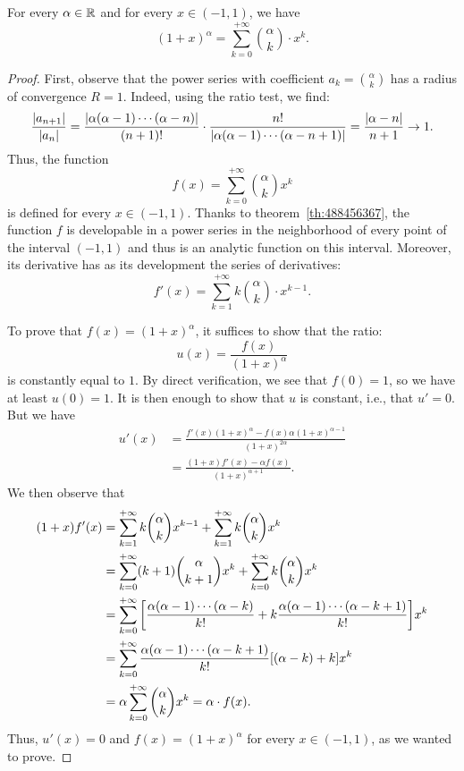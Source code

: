 \begin{theorem}
\label{th:serie_binomiale}%
%
For every $\alpha\in {\mathbb R}$ and for every $x\in (-1,1)$, we have
\[
  (1+x)^{\alpha}  = \sum_{k=0}^{+\infty} {\alpha \choose k} \cdot x^k.
\]
\end{theorem}
%
\begin{proof}
First, observe that the power series with coefficient $a_k = {\alpha \choose k}$
has a radius of convergence $R=1$. Indeed, using the ratio test, we find:
\[
  \frac{{\left|a_{n+1}\right|}}{{\left|a_n\right|}}
  = \frac{{\left|\alpha (\alpha-1) \cdots (\alpha-n)\right|}}{(n+1)!}
  \cdot \frac{n!}{{\left|\alpha(\alpha-1) \cdots (\alpha-n+1)\right|}}
  = \frac{{\left|\alpha-n\right|}}{n+1} \to 1.
\]
Thus, the function
\[
 f(x) = \sum_{k=0}^{+\infty} {\alpha \choose k} x^k
\]
is defined for every $x\in(-1,1)$. Thanks to theorem~\ref{th:488456367}, the
function $f$ is developable in a power series in the neighborhood of every point
of the interval $(-1,1)$ and thus is an analytic function on this interval.
Moreover, its derivative has as its development the series of derivatives:
\[
  f'(x) = \sum_{k=1}^{+\infty} k {\alpha \choose k} \cdot x^{k-1}.
\]

To prove that $f(x) = (1+x)^\alpha$, it suffices to show that the ratio:
\[
  u(x) = \frac{f(x)}{(1+x)^\alpha}
\]
is constantly equal to $1$. By direct verification, we see that $f(0)=1$, so we
have at least $u(0) = 1$. It is then enough to show that $u$ is constant, i.e.,
that $u'=0$. But we have
\begin{align*}
  u'(x)
    &= \frac{f'(x) (1+x)^\alpha - f(x) \alpha (1+x)^{\alpha-1}}{(1+x)^{2\alpha}}
  \\
  &= \frac{(1+x) f'(x) - \alpha f(x)}{(1+x)^{\alpha+1}}.
\end{align*}
We then observe that
\begin{align*}
(1+x)f'(x)
&= \sum_{k=1}^{+\infty} k{\alpha \choose k} x^{k-1}
+ \sum_{k=1}^{+\infty} k{\alpha \choose k} x^{k}\\
&= \sum_{k=0}^{+\infty} (k+1){\alpha \choose k+1} x^k
+ \sum_{k=0}^{+\infty} k {\alpha \choose k} x^k \\
&= \sum_{k=0}^{+\infty} {\left[ \frac{\alpha(\alpha-1) \cdots (\alpha-k)}{k!}
 + k \frac{\alpha(\alpha-1)\cdots(\alpha-k+1)}{k!} \right]} x^k \\
  &= \sum_{k=0}^{+\infty}
 \frac{\alpha(\alpha-1)\cdots(\alpha-k+1)}{k!}{\left[ (\alpha-k)+k \right]} x^k\\
 &= \alpha \sum_{k=0}^{+\infty} {\alpha \choose k} x^k = \alpha \cdot f(x).
\end{align*}
Thus, $u'(x)=0$ and $f(x) = (1+x)^\alpha$ for every $x\in(-1,1)$, as we wanted
to prove.
\end{proof}

